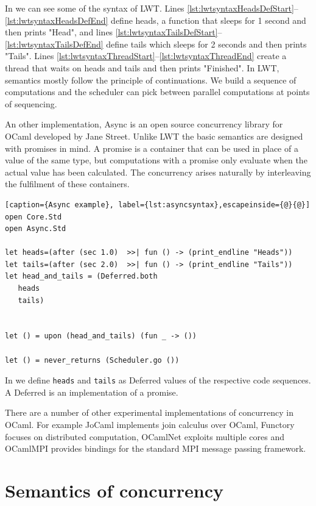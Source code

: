\documentclass[12pt,twoside,notitlepage]{report}
\begin{document}
In  we can see some of the syntax of LWT. Lines \ref{lst:lwtsyntaxHeadsDefStart}--\ref{lst:lwtsyntaxHeadsDefEnd} define heads, a function that sleeps for 1 second and then prints "Head", and lines \ref{lst:lwtsyntaxTailsDefStart}--\ref{lst:lwtsyntaxTailsDefEnd} define tails which sleeps for 2 seconds and then prints "Tails".  Lines \ref{lst:lwtsyntaxThreadStart}--\ref{lst:lwtsyntaxThreadEnd} create a thread that waits on heads and tails and then prints "Finished".  In LWT, semantics mostly follow the principle of continuations. We build a sequence of computations and the scheduler can pick between parallel computations at points of sequencing.

An other implementation, Async is an open source concurrency library for OCaml developed by Jane Street. Unlike LWT the basic semantics are designed with promises in mind. A promise is a container that can be used in place of a value of the same type, but computations with a promise only evaluate when the actual value has been calculated. The concurrency arises naturally by interleaving the fulfilment of these containers. 


\begin{minipage}{\linewidth}
\begin{lstlisting}[caption={Async example}, label={lst:asyncsyntax},escapeinside={@}{@}]
open Core.Std
open Async.Std

let heads=(after (sec 1.0)  >>| fun () -> (print_endline "Heads"))
let tails=(after (sec 2.0)  >>| fun () -> (print_endline "Tails"))
let head_and_tails = (Deferred.both
   heads
   tails)


let () = upon (head_and_tails) (fun _ -> ())
  
let () = never_returns (Scheduler.go ())
\end{lstlisting}
\end{minipage}



In  we define \verb|heads| and \verb|tails| as Deferred values of the respective code sequences. A Deferred is an implementation of a promise.


There are a number of other experimental implementations of concurrency in OCaml. For example JoCaml\cite{jocaml} implements join calculus over OCaml, Functory\cite{functory} focuses on distributed computation, OCamlNet exploits multiple cores and OCamlMPI\cite{ocamlmpi} provides bindings for the standard MPI message passing framework.


\section{Semantics of concurrency}
\end{document}
